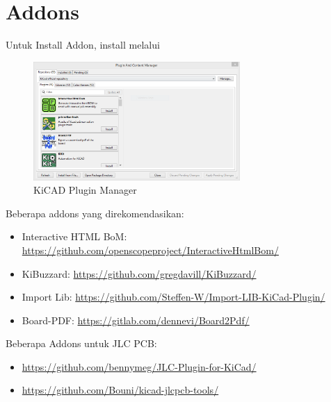 \documentclass[12pt]{book}
\begin{document}
	\section{Addons}
	
	Untuk Install Addon, install melalui 
	
	\begin{figure}[!ht]
		\centering
		\includegraphics[width=0.7\textwidth]{images/kicad/kicadpcm}
		\caption{KiCAD Plugin Manager}
	\end{figure}
	
	Beberapa addons yang direkomendasikan:
	
	\begin{itemize}
		\item Interactive HTML BoM: \url{https://github.com/openscopeproject/InteractiveHtmlBom/}
		\item KiBuzzard: \url{https://github.com/gregdavill/KiBuzzard/}
		\item Import Lib: \url{https://github.com/Steffen-W/Import-LIB-KiCad-Plugin/}
		\item Board-PDF: \url{https://gitlab.com/dennevi/Board2Pdf/}
	\end{itemize}
	
	Beberapa Addons untuk JLC PCB:
	
	\begin{itemize}
		\item \url{https://github.com/bennymeg/JLC-Plugin-for-KiCad/}
		\item \url{https://github.com/Bouni/kicad-jlcpcb-tools/}
	\end{itemize}
	
\end{document}
